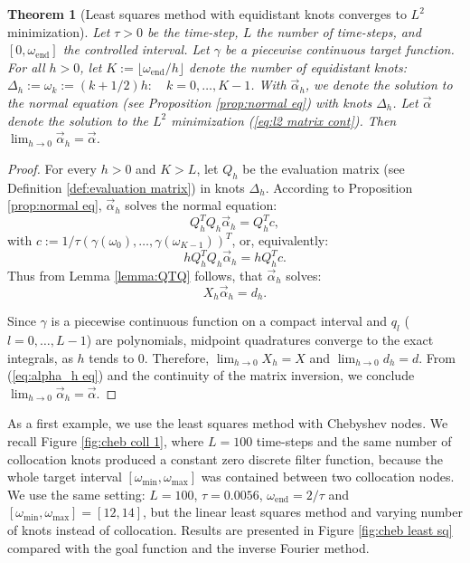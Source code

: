 \documentclass[a4paper,11pt,bibliography=totoc,listof=totoc,headinclude=true,cleardoublepage=empty,oneside]{scrbook}
\newtheorem{theorem}{Theorem}[chapter]
\newcommand{\e}{\mathrm{end}}
\renewcommand{\eqref}[1]{(\ref{#1})}
\begin{document}
\begin{theorem}[Least squares method with equidistant knots converges to $L^2$ minimization]\label{theorem:lsq converges to l2}
    Let $\tau>0$ be the time-step, $L$ the number of time-steps, and $[0, \omega_\e]$ the controlled interval. Let $\gamma$ be a piecewise continuous target function. For all $h>0$, let $K := \lfloor \omega_\e/h\rfloor $ denote the number of equidistant knots: $ \Delta_h := {\omega_k := (k+1/2)h : \quad k=0, \dots, K-1}$. With $\Vec{\alpha}_h$, we denote the solution to the normal equation (see Proposition \ref{prop:normal eq}) with knots $\Delta_h$. Let $\Vec{\alpha}$ denote the solution to the $L^2$ minimization \eqref{eq:l2 matrix cont}. Then $\lim_{h\rightarrow 0} \Vec{\alpha}_h = \Vec{\alpha}$.

\end{theorem}
\begin{proof}
    For every $h>0$ and $K>L$, let $Q_h$ be the evaluation matrix (see Definition \ref{def:evaluation matrix}) in knots $\Delta_h$. According to Proposition \ref{prop:normal eq}, $\Vec{\alpha}_h$ solves the normal equation: 
    \begin{equation*}
        Q_h^T Q_h \Vec{\alpha}_h = Q_h^Tc,
    \end{equation*}
    with $c:= 1/\tau \left(\gamma(\omega_0), \dots, \gamma(\omega_{K-1})\right)^T$, or, equivalently:
    \begin{equation*}
        hQ_h^T Q_h \Vec{\alpha}_h = hQ_h^Tc.
    \end{equation*}
    Thus from Lemma \ref{lemma:QTQ} follows, that $\Vec{\alpha}_h$ solves:
    \begin{equation}\label{eq:alpha_h eq}
        X_h \Vec{\alpha}_h = d_h.
    \end{equation}
    
    Since $\gamma$ is a piecewise continuous function on a compact interval and $q_l$ ($l = 0, \dots, L-1$) are polynomials, midpoint quadratures converge to the exact integrals, as $h$ tends to 0. Therefore, $\lim_{h\rightarrow 0} X_h = X$ and $\lim_{h\rightarrow 0} d_h = d$. From \eqref{eq:alpha_h eq} and the continuity of the matrix inversion, we conclude $\lim_{h\rightarrow 0} \Vec{\alpha}_h = \Vec{\alpha}$.
\end{proof}

As a first example, we use the least squares method with Chebyshev nodes. We recall Figure \ref{fig:cheb coll 1}, where $L=100$ time-steps and the same number of collocation knots produced a constant zero discrete filter function, because the whole target interval $\left[\omega_{\min}, \omega_{\max}\right]$ was contained between two collocation nodes. We use the same setting: $L=100$, $\tau = 0.0056$, $\omega_\e = 2/\tau$ and $\left[\omega_{\min}, \omega_{\max}\right] = [12, 14]$, but the linear least squares method  and varying number of knots instead of collocation. Results are presented in Figure \ref{fig:cheb least sq} compared with the goal function and the inverse Fourier method.
\end{document}
